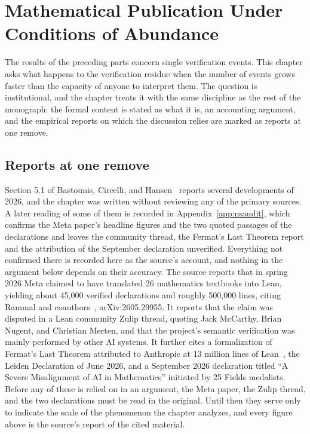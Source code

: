 \chapter[Publication Under Abundance]{Mathematical Publication Under Conditions of Abundance}
\label{ch:abundance}

The results of the preceding parts concern single verification events. This chapter asks what happens to the verification residue when the number of events grows faster than the capacity of anyone to interpret them. The question is institutional, and the chapter treats it with the same discipline as the rest of the monograph: the formal content is stated as what it is, an accounting argument, and the empirical reports on which the discussion relies are marked as reports at one remove.

\section{Reports at one remove}

Section 5.1 of Bastounis, Circelli, and Hansen~\cite{BCH26} reports several developments of 2026, and the chapter was written without reviewing any of the primary sources. A later reading of some of them is recorded in Appendix~\ref{app:nsaudit}, which confirms the Meta paper's headline figures and the two quoted passages of the declarations and leaves the community thread, the Fermat's Last Theorem report and the attribution of the September declaration unverified. Everything not confirmed there is recorded here as the source's account, and nothing in the argument below depends on their accuracy. The source reports that in spring 2026 Meta claimed to have translated 26 mathematics textbooks into Lean, yielding about 45,000 verified declarations and roughly 500,000 lines, citing Rammal and coauthors~\cite{Rammal26}, arXiv:2605.29955. It reports that the claim was disputed in a Lean community Zulip thread, quoting Jack McCarthy, Brian Nugent, and Christian Merten, and that the project's semantic verification was mainly performed by other AI systems. It further cites a formalization of Fermat's Last Theorem attributed to Anthropic at 13 million lines of Lean~\cite{Buzzard26}, the Leiden Declaration of June 2026, and a September 2026 declaration titled ``A Severe Misalignment of AI in Mathematics'' initiated by 25 Fields medalists. Before any of these is relied on in an argument, the Meta paper, the Zulip thread, and the two declarations must be read in the original. Until then they serve only to indicate the scale of the phenomenon the chapter analyzes, and every figure above is the source's report of the cited material.

